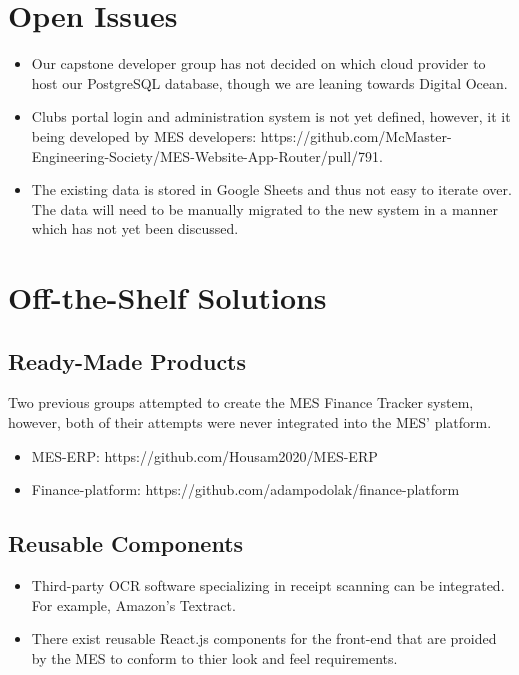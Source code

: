\documentclass[12pt]{article}
\begin{document}
\section{Open Issues}
  \begin{itemize}
    \item Our capstone developer group has not decided on which cloud provider to host our PostgreSQL database, though we are leaning towards Digital Ocean.
    \item Clubs portal login and administration system is not yet defined, however, it it being developed by MES developers: https://github.com/McMaster-Engineering-Society/MES-Website-App-Router/pull/791.
    \item The existing data is stored in Google Sheets and thus not easy to iterate over. The data will need to be manually migrated to the new system in a manner which has not yet been discussed.
  \end{itemize}

\section{Off-the-Shelf Solutions}
  \subsection{Ready-Made Products}
  Two previous groups attempted to create the MES Finance Tracker system, however, both of their attempts were never integrated into the MES' platform.  
  \begin{itemize}
      \item MES-ERP: https://github.com/Housam2020/MES-ERP
      \item Finance-platform: https://github.com/adampodolak/finance-platform
    \end{itemize}

  \subsection{Reusable Components}
    \begin{itemize}
      \item Third-party OCR software specializing in receipt scanning can be integrated. For example, Amazon's Textract.
      \item There exist reusable React.js components for the front-end that are proided by the MES to conform to thier look and feel requirements.
    \end{itemize}
\end{document}
